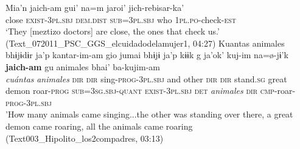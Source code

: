 \documentclass[output=paper]{langsci/langscibook}
\begin{document}
\ea
\label{ex:odam-checkus}
\gll Mia’n 	jaich-am 		gui’ 	na=m jaroi’ 		jich-rebisar-ka’\\
close	\textsc{exist-3pl.sbj} 	\textsc{dem.dist} 	\textsc{sub=3pl.sbj} who 	\textsc{1pl.po}-check-\textsc{est}\\
\glt ‘They [meztizo doctors] are close, the ones that check us.’ (Text\_072011\_PSC\_GGS\_elcuidadodelamujer1, 04:27)
\z 
\ea
\label{ex:odam-curesabi}
\gll Kuantas animales bhɨjɨdɨr ja'p kantar-im-am gio jumai bhɨjɨ ja'p kɨɨk g ja'ok' kuj-im na=\o-jɨ'k \textbf{jaich-am} gu animales bhai' ba-kujim-am\\
\emph{cuántas} \emph{animales} \textsc{dir} \textsc{dir} sing-\textsc{prog-3pl.sbj} and other \textsc{dir} \textsc{dir} stand.\textsc{sg} great demon roar-\textsc{prog} \textsc{sub=3sg.sbj}-\textsc{quant} \textsc{exist-3pl.sbj} \textsc{det} \emph{animales} \textsc{dir} \textsc{cmp}-roar-\textsc{prog-3pl.sbj}\\
\glt 'How many animals came singing...the other  was standing over there, a great demon came roaring, all the animals came roaring
(Text003\_Hipolito\_los2compadres, 03:13)
\z 
\end{document}
